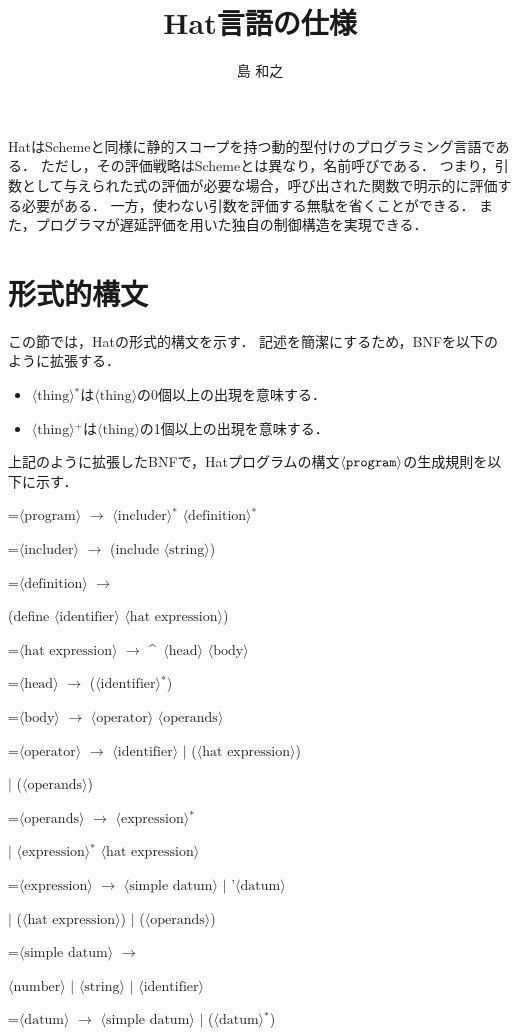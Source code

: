 \documentclass[twocolumn]{jarticle}
\def\hat{\mbox{\^{ }}}
\def\|{ $|$ \allowbreak}
\def\*{$^*$}
\def\+{$^+$}
\newcommand{\NT}[1]{\ensuremath{\langle\mbox{#1}\rangle}\allowbreak}
\newcommand{\lrto}{ \ensuremath{\rightarrow} \allowbreak}
\newenvironment{hang}[1][\parindent]
  {\def\item{\par\hangindent=#1\noindent}}
  {\par}
\begin{document}
\title{Hat言語の仕様}
\author{島 和之}
\maketitle

HatはSchemeと同様に静的スコープを持つ動的型付けのプログラミング言語である．
ただし，その評価戦略はSchemeとは異なり，名前呼びである．
つまり，引数として与えられた式の評価が必要な場合，呼び出された関数で明示的に評価する必要がある．
一方，使わない引数を評価する無駄を省くことができる．
また，プログラマが遅延評価を用いた独自の制御構造を実現できる．

\section{形式的構文}

この節では，Hatの形式的構文を示す．
記述を簡潔にするため，BNFを以下のように拡張する．
\begin{itemize}
\item\NT{thing}\*は\NT{thing}の0個以上の出現を意味する．
\item\NT{thing}\+は\NT{thing}の1個以上の出現を意味する．
\end{itemize}
上記のように拡張したBNFで，Hatプログラムの構文\NT{\tt program}の生成規則を以下に示す．
\begin{hang}\tt %
\item\NT{program}\lrto
  \NT{includer}\* \NT{definition}\*
\item\NT{includer}\lrto
  (include \NT{string})
\item\NT{definition}\lrto\par
  (define \NT{identifier} \NT{hat expression})
\item\NT{hat expression}\lrto
  \hat\ \NT{head} \NT{body}
\item\NT{head}\lrto
  (\NT{identifier}\*)
\item\NT{body}\lrto
  \NT{operator} \NT{operands}
\item\NT{operator}\lrto
  \NT{identifier}
  \| (\NT{hat expression}) \par
  \| (\NT{operands})
\item\NT{operands}\lrto
  \NT{expression}\* \par
  \| \NT{expression}\* \NT{hat expression}
\item\NT{expression}\lrto
  \NT{simple datum}
  \| '\NT{datum} \par
  \| (\NT{hat expression})
  \| (\NT{operands})
\item\NT{simple datum}\lrto \par
  \NT{number} \| \NT{string} \| \NT{identifier}
\item\NT{datum}\lrto
  \NT{simple datum}
  \| (\NT{datum}\*)
\end{hang}
\end{document}
